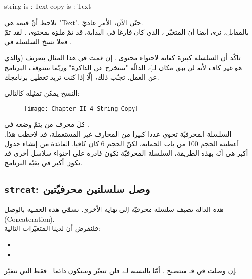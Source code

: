 \begin{Console}
string is : Text
copy is : Text
\end{Console}

نلاحظ أنّ قيمة
هي
"\textenglish{Text}".
حتّى الآن، الأمر عاديّ.\\
بالمقابل، نرى أيضا أن المتغيّر
،
الذي كان فارغا في البداية، قد تمّ ملؤه بمحتوى
.
لقد تمّ فعلا نسخ السلسلة في
.

\begin{warning}
  تأكّد أن السلسلة
  كبيرة كفاية لاحتواء محتوى
  .
  إن قمت في هذا المثال بتعريف
(والذي هو غير كاف لأنه لن يبق مكان لـ)،
  الدالّة
  "ستخرج عن الذاكرة" وربّما ستوقف البرنامج عن العمل. تجنّب ذلك، إلّا إذا كنت تريد تعطيل برنامجك.
\end{warning}

النسخ يمكن تمثيله كالتالي:

\begin{figure}[H]
	\centering
	\texttt{[image: Chapter\_II-4\_String-Copy]}
\end{figure}
كلّ محرف من
يتمّ وضعه في
.\\
السلسلة المحرفيّة
تحوي عددا كبيرا من المحارف غير المستعملة، قد لاحظت هذا. أعطيته الحجم 100 من باب الحماية، لكنّ الحجم 6 كان كافيا.
الفائدة من إنشاء جدول أكبر هي أنّه بهذه الطريقة، السلسلة المحرفيّة
تكون قادرة على احتواء سلاسل أخرى قد تكون أكبر في بقيّة البرنامج.

\subsection{\texttt{strcat}: وصل سلسلتين محرفيّتين}

هذه الدالة تضيف سلسلة محرفيّة إلى نهاية الأخرى. نسمّي هذه العملية بالوصل
(\textenglish{Concatenation}).\\
فلنفرض أن لدينا المتغيّرات التالية:

\begin{itemize}
  \item {}
  \item {}
\end{itemize}

إن وصلت
في
فـ
ستصبح
.
أمّا بالنسبة لـ،
فلن تتغيّر وستكون دائما
.
فقط
التي تتغيّر.

